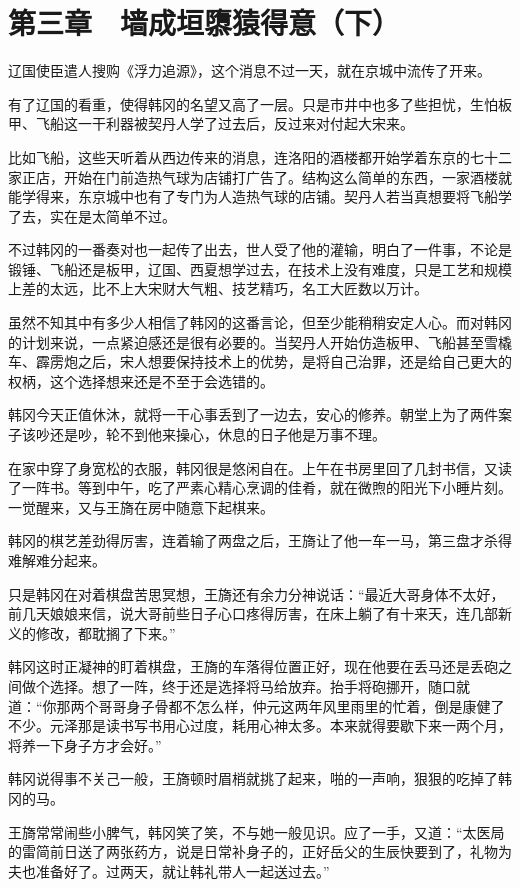 \section{第三章　墙成垣隳猿得意（下）}

辽国使臣遣人搜购《浮力追源》，这个消息不过一天，就在京城中流传了开来。

有了辽国的看重，使得韩冈的名望又高了一层。只是市井中也多了些担忧，生怕板甲、飞船这一干利器被契丹人学了过去后，反过来对付起大宋来。

比如飞船，这些天听着从西边传来的消息，连洛阳的酒楼都开始学着东京的七十二家正店，开始在门前造热气球为店铺打广告了。结构这么简单的东西，一家酒楼就能学得来，东京城中也有了专门为人造热气球的店铺。契丹人若当真想要将飞船学了去，实在是太简单不过。

不过韩冈的一番奏对也一起传了出去，世人受了他的灌输，明白了一件事，不论是锻锤、飞船还是板甲，辽国、西夏想学过去，在技术上没有难度，只是工艺和规模上差的太远，比不上大宋财大气粗、技艺精巧，名工大匠数以万计。

虽然不知其中有多少人相信了韩冈的这番言论，但至少能稍稍安定人心。而对韩冈的计划来说，一点紧迫感还是很有必要的。当契丹人开始仿造板甲、飞船甚至雪橇车、霹雳炮之后，宋人想要保持技术上的优势，是将自己治罪，还是给自己更大的权柄，这个选择想来还是不至于会选错的。

韩冈今天正值休沐，就将一干心事丢到了一边去，安心的修养。朝堂上为了两件案子该吵还是吵，轮不到他来操心，休息的日子他是万事不理。

在家中穿了身宽松的衣服，韩冈很是悠闲自在。上午在书房里回了几封书信，又读了一阵书。等到中午，吃了严素心精心烹调的佳肴，就在微煦的阳光下小睡片刻。一觉醒来，又与王旖在房中随意下起棋来。

韩冈的棋艺差劲得厉害，连着输了两盘之后，王旖让了他一车一马，第三盘才杀得难解难分起来。

只是韩冈在对着棋盘苦思冥想，王旖还有余力分神说话：“最近大哥身体不太好，前几天娘娘来信，说大哥前些日子心口疼得厉害，在床上躺了有十来天，连几部新义的修改，都耽搁了下来。”

韩冈这时正凝神的盯着棋盘，王旖的车落得位置正好，现在他要在丢马还是丢砲之间做个选择。想了一阵，终于还是选择将马给放弃。抬手将砲挪开，随口就道：“你那两个哥哥身子骨都不怎么样，仲元这两年风里雨里的忙着，倒是康健了不少。元泽那是读书写书用心过度，耗用心神太多。本来就得要歇下来一两个月，将养一下身子方才会好。”

韩冈说得事不关己一般，王旖顿时眉梢就挑了起来，啪的一声响，狠狠的吃掉了韩冈的马。

王旖常常闹些小脾气，韩冈笑了笑，不与她一般见识。应了一手，又道：“太医局的雷简前日送了两张药方，说是日常补身子的，正好岳父的生辰快要到了，礼物为夫也准备好了。过两天，就让韩礼带人一起送过去。”

